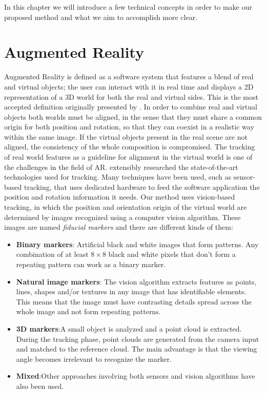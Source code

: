 
In this chapter we will introduce a few technical concepts in order to make our proposed method and what we aim to accomplish more clear.

\section{Augmented Reality}
Augmented Reality is defined as a software system that features a blend of real and virtual objects; the user can interact with it in real time and displays a 2D representation of a 3D world for both the real and virtual sides. This is the most accepted definition originally presented by \citep{azuma1997}. \newline
In order to combine real and virtual objects both worlds must be aligned, in the sense that they must share a common origin for both position and rotation, so that they can coexist in a realistic way within the same image. If the virtual objects present in the real scene are not aligned, the consistency of the whole composition is compromised. \newline
The tracking of real world features as a guideline for alignment in the virtual world is one of the challenges in the field of AR. \citep{zhou2008} extensibly researched the state-of-the-art technologies used for tracking. Many techniques have been used, such as sensor-based tracking, that uses dedicated hardware to feed the software application the position and rotation information it needs. Our method uses vision-based tracking, in which the position and orientation origin of the virtual world are determined by images recognized using a computer vision algorithm. These images are named \emph{fiducial markers} and  there are different kinds of them:
\begin{itemize}
  \item \textbf{Binary markers}: Artificial black and white images that form patterns. Any combination of at least $8\times8$ black and white pixels that don't form a repeating pattern can work as a binary marker.
  \item \textbf{Natural image markers}: The vision algorithm extracts features as points, lines, shapes and/or textures in any image that has identifiable elements. This means that the image must have contrasting details spread across the whole image and not form repeating patterns.
  \item \textbf{3D markers}:A small object is analyzed and a point cloud is extracted. During the tracking phase, point clouds are generated from the camera input and matched to the reference cloud. The main advantage is that the viewing angle becomes irrelevant to recognize the marker.
  \item \textbf{Mixed}:Other approaches involving both sensors and vision algorithms have also been used. 
\end{itemize}

